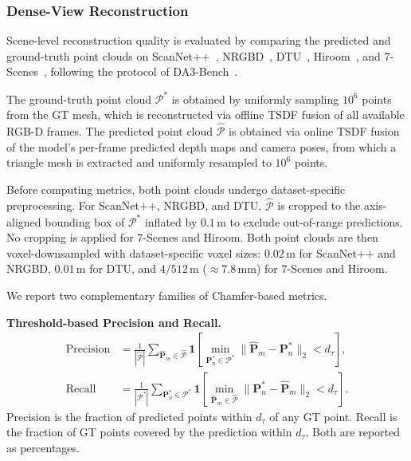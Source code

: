 \subsubsection{Dense-View Reconstruction}
\label{appendix:metrics:recon}

Scene-level reconstruction quality is evaluated by comparing the predicted and ground-truth point clouds on ScanNet++~\citep{yeshwanth2023scannet++}, NRGBD~\citep{azinovic2022Neuralrgbd}, DTU~\citep{jensen2014dtu}, Hiroom~\citep{lin2025depth}, and 7-Scenes~\citep{shotton20137scenes}, following the protocol of DA3-Bench~\citep{lin2025depth}.

The ground-truth point cloud $\mathcal{P}^{*}$ is obtained by uniformly sampling 
$10^{6}$ points from the GT mesh, which is reconstructed via offline TSDF fusion 
of all available RGB-D frames.
%
The predicted point cloud $\hat{\mathcal{P}}$ is obtained via online TSDF fusion of the model's per-frame predicted depth maps and camera poses, from which a triangle mesh is extracted and uniformly resampled to $10^{6}$ points.

Before computing metrics, both point clouds undergo dataset-specific preprocessing.
%
For ScanNet++, NRGBD, and DTU, $\hat{\mathcal{P}}$ is cropped to the axis-aligned bounding box of $\mathcal{P}^{*}$ inflated by $0.1$\,m to exclude out-of-range predictions. 
%
No cropping is applied for 7-Scenes and Hiroom.
%
Both point clouds are then voxel-downsampled with dataset-specific voxel sizes: $0.02$\,m for ScanNet++ and NRGBD, $0.01$\,m for DTU, and $4/512$\,m (${\approx}7.8$\,mm) for 7-Scenes and Hiroom.

We report two complementary families of Chamfer-based metrics.

\noindent\textbf{Threshold-based Precision and Recall.}
\begin{align}
  \mathrm{Precision}
  &= \frac{1}{|\hat{\mathcal{P}}|}\sum_{\hat{\mathbf{P}}_m\in\hat{\mathcal{P}}}
    \mathbf{1}\!\left[\min_{\mathbf{P}_n^{*}\in\mathcal{P}^{*}}
    \bigl\|\hat{\mathbf{P}}_m - \mathbf{P}_n^{*}\bigr\|_2 < d_{\tau}\right], \\
  \mathrm{Recall}
  &= \frac{1}{|\mathcal{P}^{*}|}\sum_{\mathbf{P}_n^{*}\in\mathcal{P}^{*}}
    \mathbf{1}\!\left[\min_{\hat{\mathbf{P}}_m\in\hat{\mathcal{P}}}
    \bigl\|\mathbf{P}_n^{*} - \hat{\mathbf{P}}_m\bigr\|_2 < d_{\tau}\right].
\end{align}
Precision is the fraction of predicted points within $d_{\tau}$ of any GT point. 
Recall is the fraction of GT points covered by the prediction within $d_{\tau}$. 
Both are reported as percentages.

